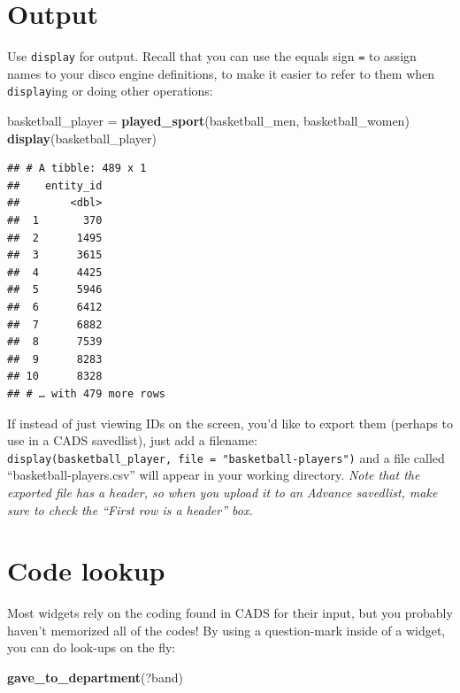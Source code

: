 \documentclass[]{book}
\newenvironment{Shaded}{\begin{snugshade}}{\end{snugshade}}
\newcommand{\KeywordTok}[1]{\textcolor[rgb]{0.13,0.29,0.53}{\textbf{#1}}}
\newcommand{\NormalTok}[1]{#1}
\newcommand{\StringTok}[1]{\textcolor[rgb]{0.31,0.60,0.02}{#1}}
\begin{document}
\hypertarget{output}{%
\section{Output}\label{output}}

Use \texttt{display} for output. Recall that you can use the equals sign \texttt{=} to assign names to your disco engine definitions, to make it easier to refer to them when \texttt{display}ing or doing other operations:

\begin{Shaded}
\begin{Highlighting}[]
\NormalTok{basketball_player =}\StringTok{ }\KeywordTok{played_sport}\NormalTok{(basketball_men, basketball_women)}
\KeywordTok{display}\NormalTok{(basketball_player)}
\end{Highlighting}
\end{Shaded}

\begin{verbatim}
## # A tibble: 489 x 1
##    entity_id
##        <dbl>
##  1       370
##  2      1495
##  3      3615
##  4      4425
##  5      5946
##  6      6412
##  7      6882
##  8      7539
##  9      8283
## 10      8328
## # … with 479 more rows
\end{verbatim}

If instead of just viewing IDs on the screen, you'd like to export them (perhaps to use in a CADS savedlist), just add a filename: \texttt{display(basketball\_player,\ file\ =\ "basketball-players")} and a file called ``basketball-players.csv'' will appear in your working directory. \emph{Note that the exported file has a header, so when you upload it to an Advance savedlist, make sure to check the ``First row is a header'' box.}

\hypertarget{code-lookup}{%
\section{Code lookup}\label{code-lookup}}

Most widgets rely on the coding found in CADS for their input, but you probably haven't memorized all of the codes! By using a question-mark inside of a widget, you can do look-ups on the fly:

\begin{Shaded}
\begin{Highlighting}[]
\KeywordTok{gave_to_department}\NormalTok{(?band)}
\end{Highlighting}
\end{Shaded}
\end{document}
